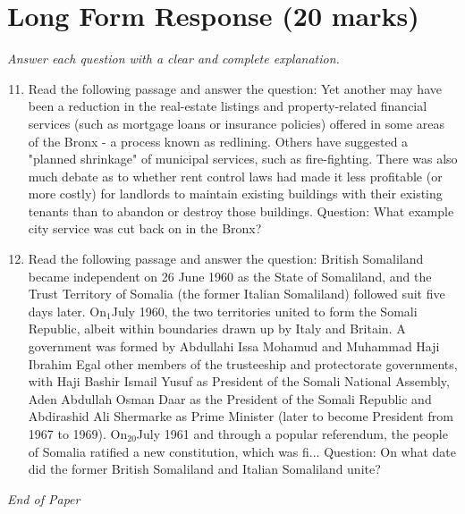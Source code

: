 \documentclass[12pt]{article}
\begin{document}
\section*{Long Form Response (20 marks)}
\textit{Answer each question with a clear and complete explanation.}
\begin{enumerate}[label=\arabic*.]
\setcounter{enumi}{10}
\item Read the following passage and answer the question: Yet another may have been a reduction in the real-estate listings and property-related financial services (such as mortgage loans or insurance policies) offered in some areas of the Bronx - a process known as redlining. Others have suggested a "planned shrinkage" of municipal services, such as fire-fighting. There was also much debate as to whether rent control laws had made it less profitable (or more costly) for landlords to maintain existing buildings with their existing tenants than to abandon or destroy those buildings. Question: What example city service was cut back on in the Bronx?
\item Read the following passage and answer the question: British Somaliland became independent on 26 June 1960 as the State of Somaliland, and the Trust Territory of Somalia (the former Italian Somaliland) followed suit five days later. On$_{1}$July 1960, the two territories united to form the Somali Republic, albeit within boundaries drawn up by Italy and Britain. A government was formed by Abdullahi Issa Mohamud and Muhammad Haji Ibrahim Egal other members of the trusteeship and protectorate governments, with Haji Bashir Ismail Yusuf as President of the Somali National Assembly, Aden Abdullah Osman Daar as the President of the Somali Republic and Abdirashid Ali Shermarke as Prime Minister (later to become President from 1967 to 1969). On$_{20}$July 1961 and through a popular referendum, the people of Somalia ratified a new constitution, which was fi... Question: On what date did the former British Somaliland and Italian Somaliland unite?
\end{enumerate}

\vfill
\noindent\textit{End of Paper}
\end{document}
